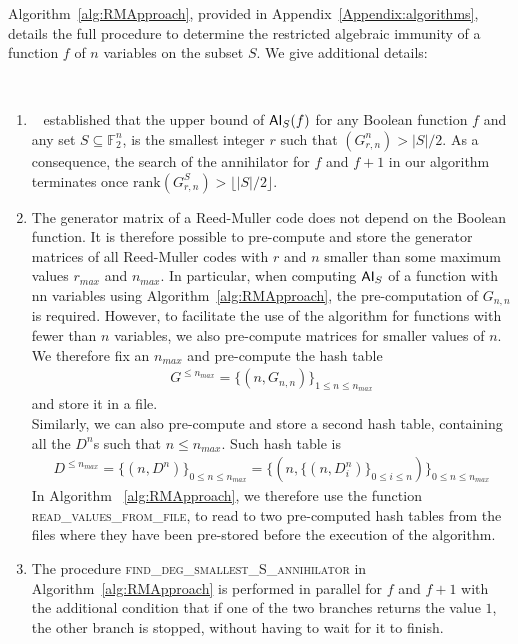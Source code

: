 \documentclass[11pt]{llncs}
\begin{document}
Algorithm~\ref{alg:RMApproach}, provided in Appendix~\ref{Appendix:algorithms}, details the full procedure to determine the restricted algebraic immunity of a function $f$ of $n$ variables on the subset $S$. 
We give additional details:

\begin{remark}~\label{rem:remarksOnAlg}
	\begin{enumerate}
		\item ~\cite{TOSC:CarMeaRot17} established that the upper bound of $\mathsf{AI}_S(f)$ for any Boolean function $f$ and any set $S\subseteq \mathbb{F}_2^n$, is the smallest integer $r$ such that $\left(G_{r,n}^n\right) > |S| / 2$. As a consequence, the search of the annihilator for $f$ and $f+ 1$ in our algorithm terminates once $\text{rank}\left(G_{r,n}^S\right) > \lfloor{|S| / 2}\rfloor$.\label{item:Item1RemOnAlg}
		\item The generator matrix of a Reed-Muller code does not depend on the Boolean function.
		 It is therefore possible to pre-compute and store the generator matrices of all Reed-Muller codes with $r$ and $n$ smaller than some maximum values $r_{max}$ and $n_{max}$. In particular, when computing $\mathsf{AI}_S$ of a function with nn variables using Algorithm~\ref{alg:RMApproach}, the pre-computation of $G_{n,n}$ is required. However, to facilitate the use of the algorithm for functions with fewer than $n$ variables, we also pre-compute matrices for smaller values of $n$.
		We therefore fix an $n_{max}$ and pre-compute the hash table
		\begin{align}\label{eq:matricesHashTable}
		G^{\leq n_{max}} = \{\left(n, G_{n,n}\right)\}_{1 \leq n \leq n_{max}}
		\end{align}
		and store it in a file.\\
        
		Similarly, we can also pre-compute and store a second hash table, containing all the $D^n$s such that $n \leq n_{max}$. Such hash table is
		\begin{align}\label{eq:degreesHashTable}
		D^{\leq n_{max}} =  \{\left(n,D^{n} \right)\}_{0 \leq n \leq n_{max}} =  \{\left(n, \{ \left(n, D_i^n\right)\}_{0\leq i \leq n} \right)\}_{0 \leq n \leq n_{max}}
		\end{align}
		In Algorithm ~\ref{alg:RMApproach}, we therefore use the function \textsc{read\_values\_from\_file}, to read to two pre-computed hash tables from the files where they have been pre-stored before the execution of the algorithm.
		\item The procedure \textsc{find\_deg\_smallest\_S\_annihilator} in Algorithm~\ref{alg:RMApproach} is performed in parallel for $f$ and $f+ 1$ with the additional condition that if one of the two branches returns the value $1$, the other branch is stopped, without having to wait for it to finish.
	\end{enumerate}	
\end{remark}
\end{document}
